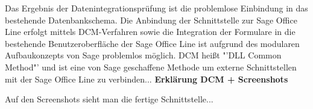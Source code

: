 Das Ergebnis der Datenintegrationsprüfung ist die problemlose Einbindung in das bestehende Datenbankschema. Die Anbindung der Schnittstelle zur Sage Office Line erfolgt mittels DCM-Verfahren sowie die Integration der Formulare in die bestehende Benutzeroberfläche der Sage Office Line ist aufgrund des modularen Aufbaukonzepts von Sage problemlos möglich. DCM heißt "'DLL Common Method"' und ist eine von Sage geschaffene Methode um externe Schnittstellen mit der Sage Office Line zu verbinden... \textbf{Erklärung DCM + Screenshots}

Auf den Screenshots sieht man die fertige Schnittstelle...